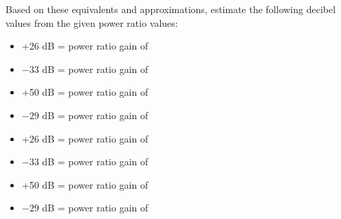 \vskip 10pt

Based on these equivalents and approximations, estimate the following decibel values from the given power ratio values:

\begin{itemize}
\item{} +26 dB = power ratio gain of \underbar{\hskip 50pt}
\vskip 5pt
\item{} $-33$ dB = power ratio gain of \underbar{\hskip 50pt}
\vskip 5pt
\item{} +50 dB = power ratio gain of \underbar{\hskip 50pt}
\vskip 5pt
\item{} $-29$ dB = power ratio gain of \underbar{\hskip 50pt}
\vskip 5pt
\end{itemize}







\begin{itemize}
\item{} +26 dB = power ratio gain of 
\vskip 5pt
\item{} $-33$ dB = power ratio gain of 
\vskip 5pt
\item{} +50 dB = power ratio gain of 
\vskip 5pt
\item{} $-29$ dB = power ratio gain of 
\vskip 5pt
\end{itemize}











